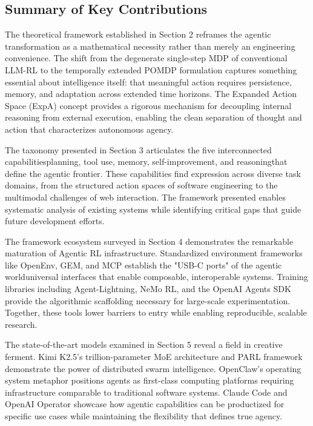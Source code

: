 \subsection{Summary of Key Contributions}

The theoretical framework established in Section 2 reframes the agentic transformation as a mathematical necessity rather than merely an engineering convenience. The shift from the degenerate single-step MDP of conventional LLM-RL to the temporally extended POMDP formulation captures something essential about intelligence itself: that meaningful action requires persistence, memory, and adaptation across extended time horizons. The Expanded Action Space (ExpA) concept provides a rigorous mechanism for decoupling internal reasoning from external execution, enabling the clean separation of thought and action that characterizes autonomous agency.

The taxonomy presented in Section 3 articulates the five interconnected capabilitiesplanning, tool use, memory, self-improvement, and reasoningthat define the agentic frontier. These capabilities find expression across diverse task domains, from the structured action spaces of software engineering to the multimodal challenges of web interaction. The framework presented enables systematic analysis of existing systems while identifying critical gaps that guide future development efforts.

The framework ecosystem surveyed in Section 4 demonstrates the remarkable maturation of Agentic RL infrastructure. Standardized environment frameworks like OpenEnv, GEM, and MCP establish the "USB-C ports" of the agentic worlduniversal interfaces that enable composable, interoperable systems. Training libraries including Agent-Lightning, NeMo RL, and the OpenAI Agents SDK provide the algorithmic scaffolding necessary for large-scale experimentation. Together, these tools lower barriers to entry while enabling reproducible, scalable research.

The state-of-the-art models examined in Section 5 reveal a field in creative ferment. Kimi K2.5's trillion-parameter MoE architecture and PARL framework demonstrate the power of distributed swarm intelligence. OpenClaw's operating system metaphor positions agents as first-class computing platforms requiring infrastructure comparable to traditional software systems. Claude Code and OpenAI Operator showcase how agentic capabilities can be productized for specific use cases while maintaining the flexibility that defines true agency.

